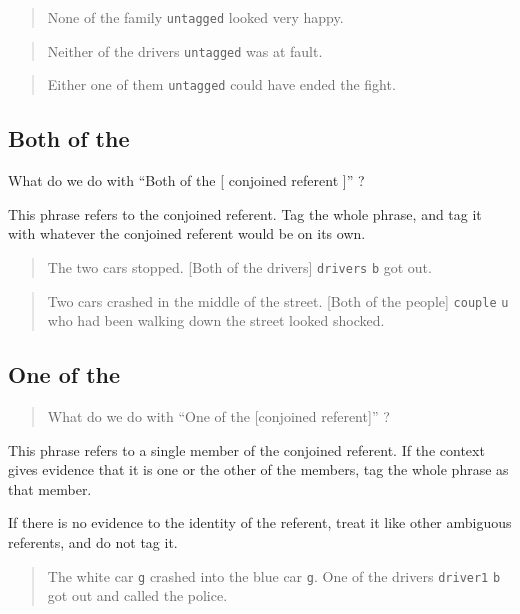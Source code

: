 \documentclass[
]{book}
\begin{document}
\begin{quote}
None of the family \texttt{untagged} looked very happy.
\end{quote}

\begin{quote}
Neither of the drivers \texttt{untagged} was at fault.
\end{quote}

\begin{quote}
Either one of them \texttt{untagged} could have ended the fight.
\end{quote}

\hypertarget{both-of-the}{%
\subsection{Both of the}\label{both-of-the}}

What do we do with ``Both of the {[} conjoined referent {]}'' ?

This phrase refers to the conjoined referent. Tag the whole phrase, and tag it with whatever the conjoined referent would be on its own.

\begin{quote}
The two cars stopped.
{[}Both of the drivers{]} \texttt{drivers} \texttt{b} got out.
\end{quote}

\begin{quote}
Two cars crashed in the middle of the street.
{[}Both of the people{]} \texttt{couple} \texttt{u} who had been walking down the street looked shocked.
\end{quote}

\hypertarget{one-of-the}{%
\subsection{One of the}\label{one-of-the}}

\begin{quote}
What do we do with ``One of the {[}conjoined referent{]}'' ?
\end{quote}

This phrase refers to a single member of the conjoined referent.
If the context gives evidence that it is one or the other of the members, tag the whole phrase as that member.

If there is no evidence to the identity of the referent, treat it like other ambiguous referents, and do not tag it.

\begin{quote}
The white car \texttt{g} crashed into the blue car \texttt{g}.
One of the drivers \texttt{driver1} \texttt{b} got out and called the police.
\end{quote}
\end{document}
